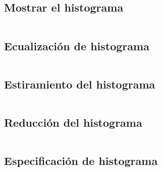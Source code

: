 \documentclass[10pt]{article}
\begin{document}
\subsection{Mostrar el histograma}
\inputminted{python}{4-histogramas/mostrar-histograma.py}

\subsection{Ecualización de histograma}
\inputminted{matlab}{4-histogramas/ecualizacion-histograma.m}

\subsection{Estiramiento del histograma}
\inputminted{python}{4-histogramas/estirar-histograma.py}

\subsection{Reducción del histograma}
\inputminted{python}{4-histogramas/reducir-histograma.py}

\subsection{Especificación de histograma}
\inputminted{matlab}{4-histogramas/especificacion-histograma.m}
\end{document}
